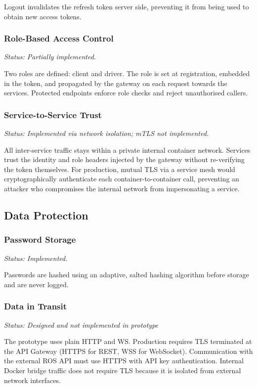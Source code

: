 Logout invalidates the refresh token server side, preventing it from being used to obtain new access tokens. 

\subsubsection{Role-Based Access Control}

\textit{Status: Partially implemented.}

Two roles are defined: client and driver. The role is set at registration, embedded in the token, and propagated by the gateway on each request towards the services. Protected endpoints enforce role checks and reject unauthorised callers.

\subsubsection{Service-to-Service Trust}

\textit{Status: Implemented via network isolation; mTLS not implemented.}

All inter-service traffic stays within a private internal container network. Services trust the identity and role headers injected by the gateway without re-verifying the token themselves. For production, mutual TLS via a service mesh would cryptographically authenticate each container-to-container call, preventing an attacker who compromises the internal network from impersonating a service.

\subsection{Data Protection}
\label{subsec:encryption}

\subsubsection{Password Storage}

\textit{Status: Implemented.}

Passwords are hashed using an adaptive, salted hashing algorithm before storage and are never logged. 

\subsubsection{Data in Transit}

\textit{Status: Designed and not implemented in prototype}

The prototype uses plain HTTP and WS. Production requires TLS terminated at the API Gateway (HTTPS for REST, WSS for WebSocket). Communication with the external ROS API must use HTTPS with API key authentication. Internal Docker bridge traffic does not require TLS because it is isolated from external network interfaces.

